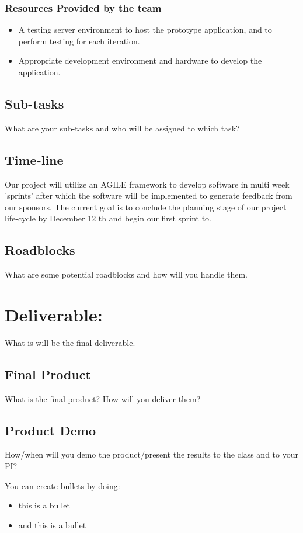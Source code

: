 \documentclass[10pt,twocolumn,letterpaper]{article}
\begin{document}
                \subsubsection{Resources Provided by the team}
                \begin{itemize}
                  \item A testing server environment to host the prototype application, and to perform testing for each iteration.
                  \item Appropriate development environment and hardware to develop the application.
                \end{itemize}
            \subsection{Sub-tasks}

            What are your sub-tasks and who will be assigned to which task?

            \subsection{Time-line}

            Our project will utilize an AGILE framework to develop software in multi week 'sprints' after which the software will be implemented to generate feedback from our sponsors. The current goal is to conclude the planning stage of our project life-cycle by December 12 th and begin our first sprint to.

            \subsection{Roadblocks}

            What are some potential roadblocks and how will you handle them.

    	\section{Deliverable:}

        What is will be the final deliverable.

            \subsection{Final Product}

            What is the final product? How will you deliver them?

            \subsection{Product Demo}

            How/when will you demo the product/present the results to the class and to your PI?

        \noindent You can create bullets by doing:

        \begin{itemize}
        	\item this is a bullet
            \item and this is a bullet
        \end{itemize}
\end{document}
